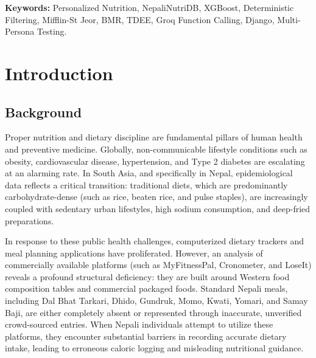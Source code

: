 \documentclass[12pt,a4paper]{report}
\begin{document}
\vspace{0.4cm}
\noindent\textbf{Keywords:} Personalized Nutrition, NepaliNutriDB, XGBoost, Deterministic Filtering, Mifflin-St Jeor, BMR, TDEE, Groq Function Calling, Django, Multi-Persona Testing.

\newpage

\tableofcontents
\thispagestyle{plain}
\newpage

\listoftables
{}
\thispagestyle{plain}
\newpage

\listoffigures
{}
\thispagestyle{plain}
\newpage

\chapter{Introduction}

\section{Background}

Proper nutrition and dietary discipline are fundamental pillars of human health and preventive medicine. Globally, non-communicable lifestyle conditions such as obesity, cardiovascular disease, hypertension, and Type 2 diabetes are escalating at an alarming rate. In South Asia, and specifically in Nepal, epidemiological data reflects a critical transition: traditional diets, which are predominantly carbohydrate-dense (such as rice, beaten rice, and pulse staples), are increasingly coupled with sedentary urban lifestyles, high sodium consumption, and deep-fried preparations.

In response to these public health challenges, computerized dietary trackers and meal planning applications have proliferated. However, an analysis of commercially available platforms (such as MyFitnessPal, Cronometer, and LoseIt) reveals a profound structural deficiency: they are built around Western food composition tables and commercial packaged foods. Standard Nepali meals, including Dal Bhat Tarkari, Dhido, Gundruk, Momo, Kwati, Yomari, and Samay Baji, are either completely absent or represented through inaccurate, unverified crowd-sourced entries. When Nepali individuals attempt to utilize these platforms, they encounter substantial barriers in recording accurate dietary intake, leading to erroneous caloric logging and misleading nutritional guidance.
\end{document}
